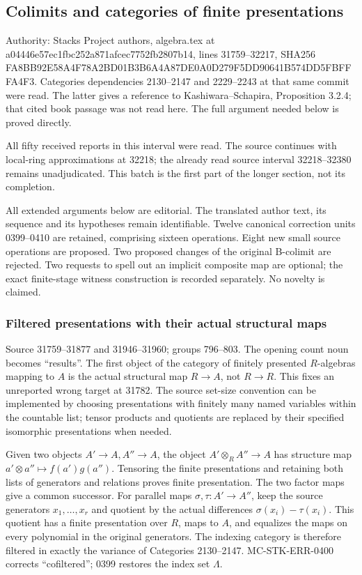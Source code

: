 \subsection{Colimits and categories of finite presentations}\label{algebra-proof-036-colimits-and-categories-of-finite-presentations}

Authority: Stacks Project authors, algebra.tex at a04446e57ec1fbc252a871afcec7752fb2807b14, lines 31759--32217, SHA256 FA8BB92E58A4F78A2BD01B3B6A4A87DE0A0D279F5DD90641B574DD5FBFFFA4F3. Categories dependencies 2130--2147 and 2229--2243 at that same commit were read. The latter gives a reference to Kashiwara--Schapira, Proposition 3.2.4; that cited book passage was not read here. The full argument needed below is proved directly.

All fifty received reports in this interval were read. The source continues with local-ring approximations at 32218; the already read source interval 32218--32380 remains unadjudicated. This batch is the first part of the longer section, not its completion.

All extended arguments below are editorial. The translated author text, its sequence and its hypotheses remain identifiable. Twelve canonical correction units 0399--0410 are retained, comprising sixteen operations. Eight new small source operations are proposed. Two proposed changes of the original B-colimit are rejected. Two requests to spell out an implicit composite map are optional; the exact finite-stage witness construction is recorded separately. No novelty is claimed.

\subsubsection{Filtered presentations with their actual structural maps}\label{algebra-proof-036-filtered-presentations-with-their-actual-structural-maps}

Source 31759--31877 and 31946--31960; groups 796--803. The opening count noun becomes ``results''. The first object of the category of finitely presented \(R\)-algebras mapping to \(A\) is the actual structural map \(R\to A\), not \(R\to R\). This fixes an unreported wrong target at 31782. The source set-size convention can be implemented by choosing presentations with finitely many named variables within the countable list; tensor products and quotients are replaced by their specified isomorphic presentations when needed.

Given two objects \(A'\to A,A''\to A\), the object \(A'\otimes_R A''\to A\) has structure map \(a'\otimes a''\mapsto f(a')g(a'')\). Tensoring the finite presentations and retaining both lists of generators and relations proves finite presentation. The two factor maps give a common successor. For parallel maps \(\sigma,\tau:A'\to A''\), keep the source generators \(x_1,\ldots,x_r\) and quotient by the actual differences \(\sigma(x_i)-\tau(x_i)\). This quotient has a finite presentation over \(R\), maps to \(A\), and equalizes the maps on every polynomial in the original generators. The indexing category is therefore filtered in exactly the variance of Categories 2130--2147. MC-STK-ERR-0400 corrects ``cofiltered''; 0399 restores the index set \(\Lambda\).

